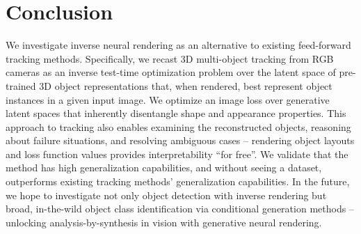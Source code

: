 \section{Conclusion}
We investigate inverse neural rendering as an alternative to existing feed-forward tracking methods. Specifically, we recast 3D multi-object tracking from RGB cameras as an inverse test-time optimization problem over the latent space of pre-trained 3D object representations that, when rendered, best represent object instances in a given input image. We optimize an image loss over generative latent spaces that inherently disentangle shape and appearance properties. This approach to tracking also enables examining the reconstructed objects, reasoning about failure situations, and resolving ambiguous cases -- rendering object layouts and loss function values provides interpretability ``for free''. We validate that the method has high generalization capabilities, and without seeing a dataset, outperforms existing tracking methods' generalization capabilities. In the future, we hope to investigate not only object detection with inverse rendering but broad, in-the-wild object class identification via conditional generation methods -- unlocking analysis-by-synthesis in vision with generative neural rendering.